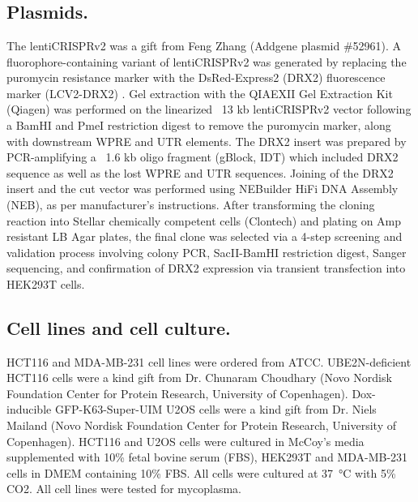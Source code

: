 
\section*{}

\subsection{Plasmids.}
The lentiCRISPRv2 was a gift from Feng Zhang (Addgene plasmid \#52961)\cite{Sanjana2014}. A fluorophore-containing variant of lentiCRISPRv2 was generated by replacing the puromycin resistance marker with the DsRed-Express2 (DRX2) fluorescence marker (LCV2-DRX2)
. Gel extraction with the QIAEXII Gel Extraction Kit (Qiagen) was performed on the linearized ~13 kb lentiCRISPRv2 vector following a BamHI and PmeI restriction digest to remove the puromycin marker, along with downstream WPRE and UTR elements. The DRX2 insert was prepared by PCR-amplifying a ~1.6 kb oligo fragment (gBlock, IDT) which included DRX2 sequence as well as the lost WPRE and UTR sequences. Joining of the DRX2 insert and the cut vector was performed using NEBuilder HiFi DNA Assembly (NEB), as per manufacturer's instructions. After transforming the cloning reaction into Stellar chemically competent cells (Clontech) and plating on Amp resistant LB Agar plates, the final clone was selected via a 4-step screening and validation process involving colony PCR, SacII-BamHI restriction digest, Sanger sequencing, and confirmation of DRX2 expression via transient transfection into HEK293T cells.

\subsection{Cell lines and cell culture.}
HCT116 and MDA-MB-231 cell lines were ordered from ATCC.
UBE2N-deficient HCT116 cells were a kind gift from Dr. Chunaram Choudhary (Novo Nordisk Foundation Center for Protein Research, University of Copenhagen). Dox-inducible GFP-K63-Super-UIM U2OS cells were a kind gift from Dr. Niels Mailand (Novo Nordisk Foundation Center for Protein Research, University of Copenhagen). HCT116 and U2OS cells were cultured in McCoy's media supplemented with 10\% fetal bovine serum (FBS), HEK293T and MDA-MB-231 cells in DMEM containing 10\% FBS. 
All cells were cultured at \SI{37}{\celsius} with 5\% CO2. All cell lines were tested for mycoplasma.

